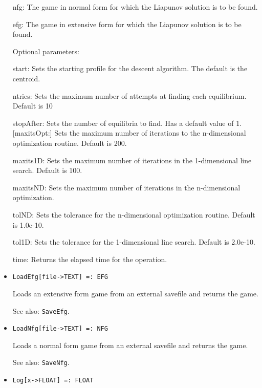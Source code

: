 \begin{itemize}
\bd
\item
[nfg:] The game in normal form for which the Liapunov solution is to
be found.
\item
[efg:] The game in extensive form for which the Liapunov solution is
to be found.
\ed

\item
[Optional parameters:]\hfil\null

\bd
\item
[start:] Sets the starting profile for the descent algorithm.  The
default is the centroid.
\item
[ntries:] Sets the maximum number of attempts at finding each
equilibrium. Default is 10
\item
[stopAfter:] Sets the number of equilibria to find.  Has a default
value of 1.  [maxitsOpt:] Sets the maximum number of iterations to the
n-dimensional optimization routine.  Default is 200.
\item
[maxits1D:] Sets the maximum number of iterations in the
1-dimensional line search.  Default is 100.
\item
[maxitsND:] Sets the maximum number of iterations in the
n-dimensional optimization.  
\item
[tolND:] Sets the tolerance for the n-dimensional optimization
routine.  Default is 1.0e-10.
\item
[tol1D:] Sets the tolerance for the 1-dimensional line search.
Default is 2.0e-10.
\item
[time:] Returns the elapsed time for the operation.
\ed
\ed

\item
\protect \large \begin{verbatim}
LoadEfg[file->TEXT] =: EFG
\end{verbatim}\normalsize

\bd
Loads an extensive form game from an external savefile
and returns the game.
\item
[See also:] {\tt SaveEfg}.
\ed

\item
\protect \large \begin{verbatim}
LoadNfg[file->TEXT] =: NFG
\end{verbatim}\normalsize

\bd
Loads a normal form game from an external savefile
and returns the game.  
\item
[See also:] {\tt SaveNfg}.
\ed

\item
\protect \large \begin{verbatim}
Log[x->FLOAT] =: FLOAT
\end{verbatim} \normalsize


\end{itemize}
